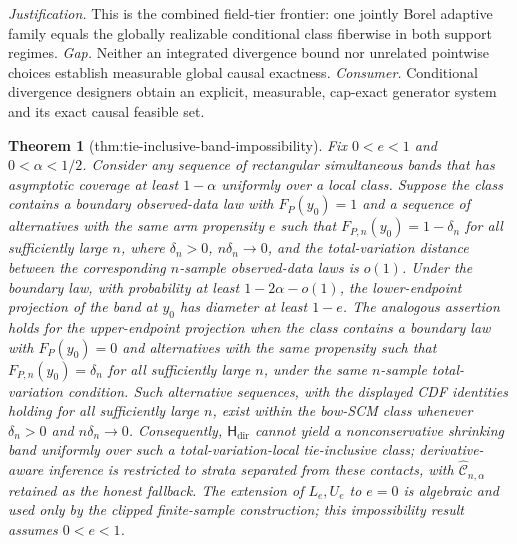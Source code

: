 \documentclass{article}
\newtheorem{theorem}{Theorem}
\begin{document}
\par\smallskip\noindent \textit{Justification.} This is the combined field-tier frontier: one jointly Borel adaptive family equals the globally realizable conditional class fiberwise in both support regimes. \textit{Gap.} Neither an integrated divergence bound nor unrelated pointwise choices establish measurable global causal exactness. \textit{Consumer.} Conditional divergence designers obtain an explicit, measurable, cap-exact generator system and its exact causal feasible set.

\begin{theorem}[thm:tie-inclusive-band-impossibility]\label{thm:tie-inclusive-band-impossibility}
Fix \(0<e<1\) and \(0<\alpha<1/2\). Consider any sequence of rectangular simultaneous bands that has asymptotic coverage at least \(1-\alpha\) uniformly over a local class. Suppose the class contains a boundary observed-data law with \(F_P(y_0)=1\) and a sequence of alternatives with the same arm propensity \(e\) such that \(F_{P,n}(y_0)=1-\delta_n\) for all sufficiently large \(n\), where \(\delta_n>0\), \(n\delta_n\to0\), and the total-variation distance between the corresponding \(n\)-sample observed-data laws is \(o(1)\). Under the boundary law, with probability at least \(1-2\alpha-o(1)\), the lower-endpoint projection of the band at \(y_0\) has diameter at least \(1-e\). The analogous assertion holds for the upper-endpoint projection when the class contains a boundary law with \(F_P(y_0)=0\) and alternatives with the same propensity such that \(F_{P,n}(y_0)=\delta_n\) for all sufficiently large \(n\), under the same \(n\)-sample total-variation condition. Such alternative sequences, with the displayed CDF identities holding for all sufficiently large \(n\), exist within the bow-SCM class whenever \(\delta_n>0\) and \(n\delta_n\to0\). Consequently, \(\mathsf H_{\mathrm{dir}}\) cannot yield a nonconservative shrinking band uniformly over such a total-variation-local tie-inclusive class; derivative-aware inference is restricted to strata separated from these contacts, with \(\widehat{\mathcal C}_{n,\alpha}\) retained as the honest fallback. The extension of \(L_e,U_e\) to \(e=0\) is algebraic and used only by the clipped finite-sample construction; this impossibility result assumes \(0<e<1\).
\end{theorem}
\end{document}
